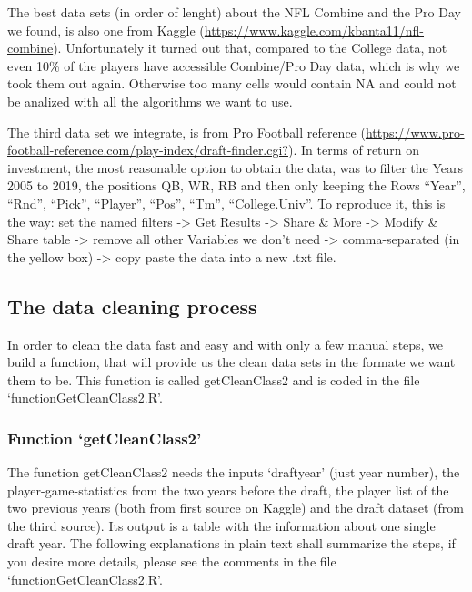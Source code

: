 \documentclass[]{article}
\begin{document}
The best data sets (in order of lenght) about the NFL Combine and the
Pro Day we found, is also one from Kaggle
(\url{https://www.kaggle.com/kbanta11/nfl-combine}). Unfortunately it
turned out that, compared to the College data, not even 10\% of the
players have accessible Combine/Pro Day data, which is why we took them
out again. Otherwise too many cells would contain NA and could not be
analized with all the algorithms we want to use.

The third data set we integrate, is from Pro Football reference
(\url{https://www.pro-football-reference.com/play-index/draft-finder.cgi?}).
In terms of return on investment, the most reasonable option to obtain
the data, was to filter the Years 2005 to 2019, the positions QB, WR, RB
and then only keeping the Rows ``Year'', ``Rnd'', ``Pick'', ``Player'',
``Pos'', ``Tm'', ``College.Univ''. To reproduce it, this is the way: set
the named filters -\textgreater{} Get Results -\textgreater{} Share \&
More -\textgreater{} Modify \& Share table -\textgreater{} remove all
other Variables we don't need -\textgreater{} comma-separated (in the
yellow box) -\textgreater{} copy paste the data into a new .txt file.

\hypertarget{the-data-cleaning-process}{%
\subsection{The data cleaning process}\label{the-data-cleaning-process}}

In order to clean the data fast and easy and with only a few manual
steps, we build a function, that will provide us the clean data sets in
the formate we want them to be. This function is called getCleanClass2
and is coded in the file `functionGetCleanClass2.R'.

\hypertarget{function-getcleanclass2}{%
\subsubsection{Function
`getCleanClass2'}\label{function-getcleanclass2}}

The function getCleanClass2 needs the inputs `draftyear' (just year
number), the player-game-statistics from the two years before the draft,
the player list of the two previous years (both from first source on
Kaggle) and the draft dataset (from the third source). Its output is a
table with the information about one single draft year. The following
explanations in plain text shall summarize the steps, if you desire more
details, please see the comments in the file `functionGetCleanClass2.R'.
\end{document}
